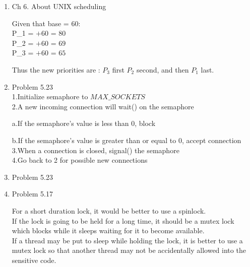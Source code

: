 \documentclass[a4paper,11pt]{article}
\theoremstyle{mytheor}
\begin{document}
\begin{enumerate}
\item {Ch 6. About UNIX scheduling}
    \par 
    Given that base = 60: \\
    P_{1} =  $+ 60$ = $80$ \\
    P_{2} =  $+ 60$ = $69$ \\
    P_{3} =  $+ 60$ = $65$ \\
    \par Thus the new priorities are : $P_{3}$  first $P_{2}$ second, and then $P_{1}$ last.
    
\setlength\parindent{24pt}

\item {Problem 5.23}\\
1.Initialize semaphore to $MAX\_SOCKETS$ \\
2.A new incoming connection will wait() on the semaphore
\par a.If the semaphore's value is less than 0, block
\par b.If the semaphore's value is greater than or equal to 0, accept connection\\
3.When a connection is closed, signal() the semaphore\\
4.Go back to 2 for possible new connections\\
\pagebreak
\item {Problem 5.23}
    \par 
    
    
\item {Problem 5.17}
    \par For a short duration lock, it would be better to use a spinlock.\\
    If the lock is going to be held for a long time, it should be a mutex lock which blocks while it sleeps waiting for it to become available. \\
    If a thread may be put to sleep while holding the lock, it is better to use a mutex lock so that another thread may not be accidentally allowed into the sensitive code.


\end{enumerate}
\end{document}
